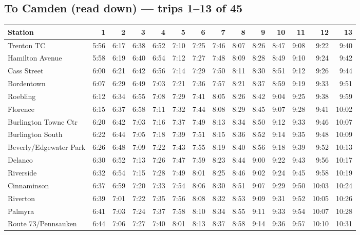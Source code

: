 \subsection*{To Camden (read down) --- trips 1--13 of 45}
\begin{center}\footnotesize\setlength{\tabcolsep}{3pt}\begin{tabular}{@{}lrrrrrrrrrrrrr@{}}\toprule
Station & 1 & 2 & 3 & 4 & 5 & 6 & 7 & 8 & 9 & 10 & 11 & 12 & 13 \\\midrule
Trenton TC & 5:56 & 6:17 & 6:38 & 6:52 & 7:10 & 7:25 & 7:46 & 8:07 & 8:26 & 8:47 & 9:08 & 9:22 & 9:40 \\
Hamilton Avenue & 5:58 & 6:19 & 6:40 & 6:54 & 7:12 & 7:27 & 7:48 & 8:09 & 8:28 & 8:49 & 9:10 & 9:24 & 9:42 \\
Cass Street & 6:00 & 6:21 & 6:42 & 6:56 & 7:14 & 7:29 & 7:50 & 8:11 & 8:30 & 8:51 & 9:12 & 9:26 & 9:44 \\
Bordentown & 6:07 & 6:29 & 6:49 & 7:03 & 7:21 & 7:36 & 7:57 & 8:21 & 8:37 & 8:59 & 9:19 & 9:33 & 9:51 \\
Roebling & 6:12 & 6:34 & 6:55 & 7:08 & 7:29 & 7:41 & 8:05 & 8:26 & 8:42 & 9:04 & 9:25 & 9:38 & 9:59 \\
Florence & 6:15 & 6:37 & 6:58 & 7:11 & 7:32 & 7:44 & 8:08 & 8:29 & 8:45 & 9:07 & 9:28 & 9:41 & 10:02 \\
Burlington Towne Ctr & 6:20 & 6:42 & 7:03 & 7:16 & 7:37 & 7:49 & 8:13 & 8:34 & 8:50 & 9:12 & 9:33 & 9:46 & 10:07 \\
Burlington South & 6:22 & 6:44 & 7:05 & 7:18 & 7:39 & 7:51 & 8:15 & 8:36 & 8:52 & 9:14 & 9:35 & 9:48 & 10:09 \\
Beverly/Edgewater Park & 6:26 & 6:48 & 7:09 & 7:22 & 7:43 & 7:55 & 8:19 & 8:40 & 8:56 & 9:18 & 9:39 & 9:52 & 10:13 \\
Delanco & 6:30 & 6:52 & 7:13 & 7:26 & 7:47 & 7:59 & 8:23 & 8:44 & 9:00 & 9:22 & 9:43 & 9:56 & 10:17 \\
Riverside & 6:32 & 6:54 & 7:15 & 7:28 & 7:49 & 8:01 & 8:25 & 8:46 & 9:02 & 9:24 & 9:45 & 9:58 & 10:19 \\
Cinnaminson & 6:37 & 6:59 & 7:20 & 7:33 & 7:54 & 8:06 & 8:30 & 8:51 & 9:07 & 9:29 & 9:50 & 10:03 & 10:24 \\
Riverton & 6:39 & 7:01 & 7:22 & 7:35 & 7:56 & 8:08 & 8:32 & 8:53 & 9:09 & 9:31 & 9:52 & 10:05 & 10:26 \\
Palmyra & 6:41 & 7:03 & 7:24 & 7:37 & 7:58 & 8:10 & 8:34 & 8:55 & 9:11 & 9:33 & 9:54 & 10:07 & 10:28 \\
Route 73/Pennsauken & 6:44 & 7:06 & 7:27 & 7:40 & 8:01 & 8:13 & 8:37 & 8:58 & 9:14 & 9:36 & 9:57 & 10:10 & 10:31 \\

\end{tabular}
\end{center}
